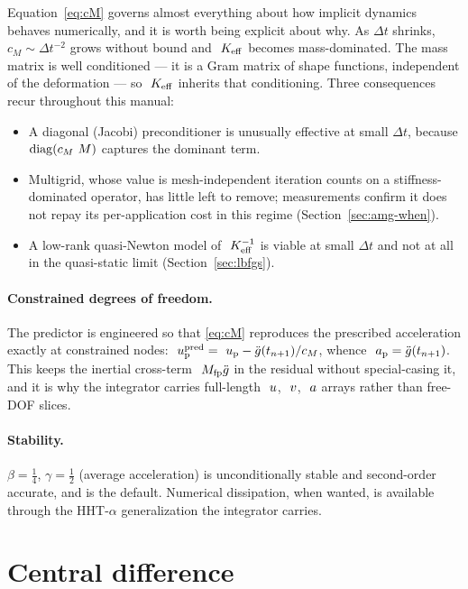 Equation~\eqref{eq:cM} governs almost everything about how implicit dynamics
behaves numerically, and it is worth being explicit about why.  As $\Delta t$
shrinks, $c_M \sim \Delta t^{-2}$ grows without bound and $~K_{\mathrm{eff}}$ becomes
mass-dominated.  The mass matrix is well conditioned --- it is a Gram matrix of
shape functions, independent of the deformation --- so $~K_{\mathrm{eff}}$ inherits that
conditioning.  Three consequences recur throughout this manual:

\begin{itemize}
  \item A diagonal (Jacobi) preconditioner is unusually effective at small
        $\Delta t$, because $\operatorname{diag}(c_M~M)$ captures the dominant term.
  \item Multigrid, whose value is mesh-independent iteration counts on a
        stiffness-dominated operator, has little left to remove; measurements
        confirm it does not repay its per-application cost in this regime
        (Section~\ref{sec:amg-when}).
  \item A low-rank quasi-Newton model of $~K_{\mathrm{eff}}^{-1}$ is viable at small
        $\Delta t$ and not at all in the quasi-static limit
        (Section~\ref{sec:lbfgs}).
\end{itemize}

\paragraph{Constrained degrees of freedom.}  The predictor is engineered so
that \eqref{eq:cM} reproduces the prescribed acceleration exactly at
constrained nodes: $~u^{\mathrm{pred}}_{\mathrm{p}} = ~u_{\mathrm{p}} -
\ddot{g}(t_{n+1})/c_M$, whence $~a_{\mathrm{p}} = \ddot{g}(t_{n+1})$.  This
keeps the inertial cross-term $~M_{\mathrm{fp}}\ddot{g}$ in the residual
without special-casing it, and it is why the integrator carries full-length
$~u$, $~v$, $~a$ arrays rather than free-DOF slices.

\paragraph{Stability.}  $\beta = \tfrac14$, $\gamma = \tfrac12$ (average
acceleration) is unconditionally stable and second-order accurate, and is the
default.  Numerical dissipation, when wanted, is available through the
HHT-$\alpha$ generalization the integrator carries.

\section{Central difference}
\label{sec:central-difference}

